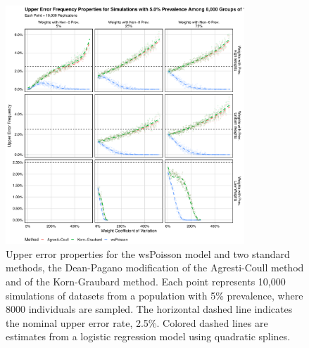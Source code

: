 \begin{figure}
\centering
\includegraphics[width=0.8\textwidth]{perfect_upper_error_frequency_8000_groups_0_05_prev}
\caption{Upper error properties for the wsPoisson model and two standard methods, the Dean-Pagano modification of the Agresti-Coull method and of the Korn-Graubard method.
Each point represents 10,000 simulations of datasets from a population with 5\% prevalence, where 8000 individuals are sampled.
The horizontal dashed line indicates the nominal upper error rate, 2.5\%.
Colored dashed lines are estimates from a logistic regression model using quadratic splines.}
\label{ch_3:fig:perfect_upper_error_frequency_8000_groups_0_05_prev}
\end{figure}

